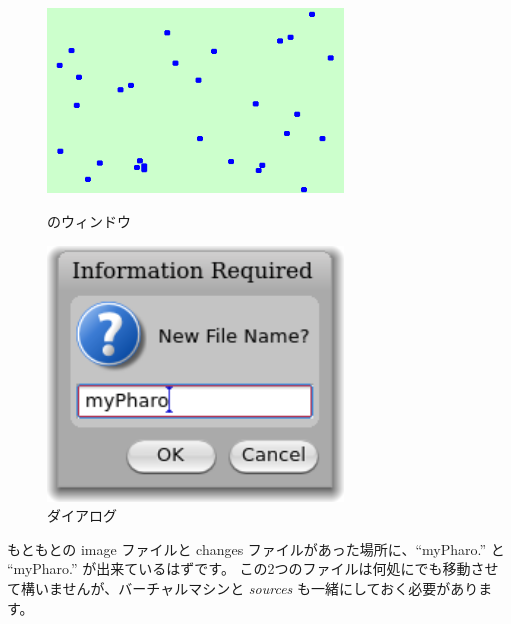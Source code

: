 \documentclass[a4paper,10pt,twoside]{book}
\begin{document}

\begin{figure}[htb]
\begin{minipage}[b]{0.48\textwidth}
\centerline {\includegraphics[width=0.7\textwidth]{atoms}}
\caption{\bam のウィンドウ}
\end{minipage}
\hfill
\begin{minipage}[b]{0.48\textwidth}
\centerline {\includegraphics[width=0.7\textwidth]{saveAs}}
\caption{ ダイアログ}
\end{minipage}
\end{figure}


もともとの image ファイルと changes ファイルがあった場所に、``myPharo.'' と ``myPharo.'' が出来ているはずです。
この2つのファイルは何処にでも移動させて構いませんが、バーチャルマシンと \emph{sources} も一緒にしておく必要があります。
\end{document}
